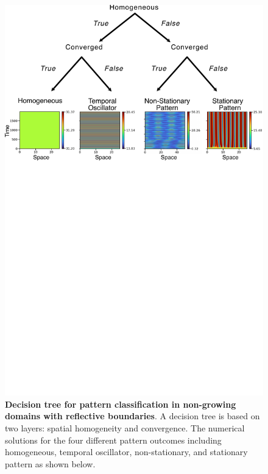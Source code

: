 \begin{figure}[!h]
    \includegraphics[width=1\textwidth]{figures/no_growth_classification}

    \caption{\textbf{Decision tree for pattern classification in non-growing domains with reflective boundaries}. A decision tree is based on two layers: spatial homogeneity and convergence. The numerical solutions for the four different pattern outcomes including  homogeneous, temporal oscillator, non-stationary, and stationary pattern as shown below.}
    \label{sup_fig2}
\end{figure}


